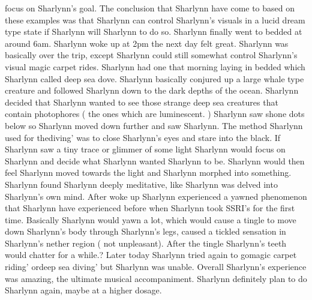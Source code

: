 \documentclass[12pt]{book}
\begin{document}
focus on Sharlynn's goal. The conclusion that Sharlynn have come to based on these examples was that Sharlynn can control Sharlynn's visuals in a lucid dream type state if Sharlynn will Sharlynn to do so. Sharlynn finally went to bedded at around 6am. Sharlynn woke up at 2pm the next day felt great. Sharlynn was basically over the trip, except Sharlynn could still somewhat control Sharlynn's visual magic carpet rides. Sharlynn had one that morning laying in bedded which Sharlynn called deep sea dove. Sharlynn basically conjured up a large whale type creature and followed Sharlynn down to the dark depths of the ocean. Sharlynn decided that Sharlynn wanted to see those strange deep sea creatures that contain photophores ( the ones which are luminescent. ) Sharlynn saw shone dots below so Sharlynn moved down further and saw Sharlynn. The method Sharlynn used for thediving' was to close Sharlynn's eyes and stare into the black. If Sharlynn saw a tiny trace or glimmer of some light Sharlynn would focus on Sharlynn and decide what Sharlynn wanted Sharlynn to be. Sharlynn would then feel Sharlynn moved towards the light and Sharlynn morphed into something. Sharlynn found Sharlynn deeply meditative, like Sharlynn was delved into Sharlynn's own mind. After woke up Sharlynn experienced a yawned phenomenon that Sharlynn have experienced before when Sharlynn took SSRI's for the first time. Basically Sharlynn would yawn a lot, which would cause a tingle to move down Sharlynn's body through Sharlynn's legs, caused a tickled sensation in Sharlynn's nether region ( not unpleasant). After the tingle Sharlynn's teeth would chatter for a while.? Later today Sharlynn tried again to gomagic carpet riding' ordeep sea diving' but Sharlynn was unable. Overall Sharlynn's experience was amazing, the ultimate musical accompaniment. Sharlynn definitely plan to do Sharlynn again, maybe at a higher dosage.
\end{document}
